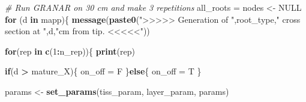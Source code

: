 \documentclass[]{article}
\newenvironment{Shaded}{\begin{snugshade}}{\end{snugshade}}
\newcommand{\KeywordTok}[1]{\textcolor[rgb]{0.13,0.29,0.53}{\textbf{#1}}}
\newcommand{\DecValTok}[1]{\textcolor[rgb]{0.00,0.00,0.81}{#1}}
\newcommand{\StringTok}[1]{\textcolor[rgb]{0.31,0.60,0.02}{#1}}
\newcommand{\CommentTok}[1]{\textcolor[rgb]{0.56,0.35,0.01}{\textit{#1}}}
\newcommand{\OtherTok}[1]{\textcolor[rgb]{0.56,0.35,0.01}{#1}}
\newcommand{\ControlFlowTok}[1]{\textcolor[rgb]{0.13,0.29,0.53}{\textbf{#1}}}
\newcommand{\OperatorTok}[1]{\textcolor[rgb]{0.81,0.36,0.00}{\textbf{#1}}}
\newcommand{\NormalTok}[1]{#1}
\begin{document}
\begin{Shaded}
\begin{Highlighting}[]
{  \CommentTok{# Run GRANAR on 30 cm and make 3 repetitions }
\NormalTok{  all_roots =}\StringTok{ }\NormalTok{nodes <-}\StringTok{ }\OtherTok{NULL}
  \ControlFlowTok{for}\NormalTok{ (d }\ControlFlowTok{in}\NormalTok{ mapp)\{}
    \KeywordTok{message}\NormalTok{(}\KeywordTok{paste0}\NormalTok{(}\StringTok{">>>>> Generation of "}\NormalTok{,root_type,}\StringTok{" cross section at "}\NormalTok{,d,}\StringTok{"cm from tip. <<<<<"}\NormalTok{))}
    
    \ControlFlowTok{for}\NormalTok{(rep }\ControlFlowTok{in} \KeywordTok{c}\NormalTok{(}\DecValTok{1}\OperatorTok{:}\NormalTok{n_rep))\{}
      \KeywordTok{print}\NormalTok{(rep)}
      
      \ControlFlowTok{if}\NormalTok{(d }\OperatorTok{>}\StringTok{ }\NormalTok{mature_X)\{}
\NormalTok{        on_off =}\StringTok{ }\NormalTok{F}
\NormalTok{      \}}\ControlFlowTok{else}\NormalTok{\{}
\NormalTok{        on_off =}\StringTok{ }\NormalTok{T}
\NormalTok{      \}}
      
\NormalTok{      params <-}\StringTok{ }\KeywordTok{set_params}\NormalTok{(tiss_param, layer_param, params)}
      
}
\end{Highlighting}
\end{Shaded}
\end{document}
